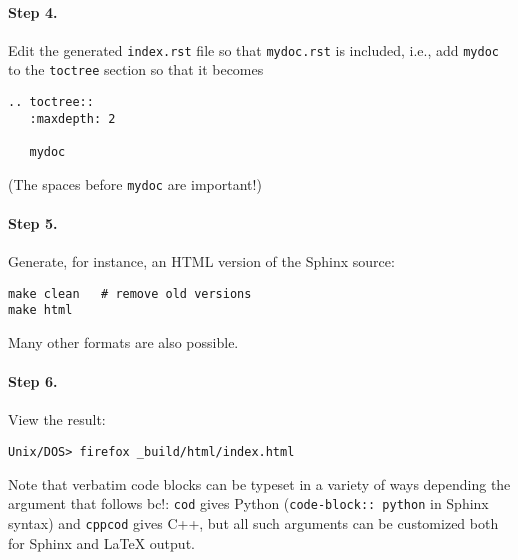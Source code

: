 \documentclass{article}
\begin{document}
\paragraph{Step 4.}
Edit the generated {\fontsize{10pt}{10pt}\verb!index.rst!} file so that {\fontsize{10pt}{10pt}\verb!mydoc.rst!}
is included, i.e., add {\fontsize{10pt}{10pt}\verb!mydoc!} to the {\fontsize{10pt}{10pt}\verb!toctree!} section so that it becomes
\begin{Verbatim}[fontsize=\fontsize{9pt}{9pt},tabsize=8,baselinestretch=0.85,
fontfamily=tt,xleftmargin=7mm]
.. toctree::
   :maxdepth: 2

   mydoc
\end{Verbatim}
\noindent
(The spaces before {\fontsize{10pt}{10pt}\verb!mydoc!} are important!)

\paragraph{Step 5.}
Generate, for instance, an HTML version of the Sphinx source:
\vspace{4pt}
\begin{Verbatim}[numbers=none,frame=lines,label=\fbox{{\tiny Terminal}},fontsize=\fontsize{9pt}{9pt},
labelposition=topline,framesep=2.5mm,framerule=0.7pt]
make clean   # remove old versions
make html
\end{Verbatim}
Many other formats are also possible.

\paragraph{Step 6.}
View the result:
\vspace{4pt}
\begin{Verbatim}[numbers=none,frame=lines,label=\fbox{{\tiny Terminal}},fontsize=\fontsize{9pt}{9pt},
labelposition=topline,framesep=2.5mm,framerule=0.7pt]
Unix/DOS> firefox _build/html/index.html
\end{Verbatim}

Note that verbatim code blocks can be typeset in a variety of ways
depending the argument that follows {\fontsize{10pt}{10pt}\verb!!bc!}: {\fontsize{10pt}{10pt}\verb!cod!} gives Python
({\fontsize{10pt}{10pt}\verb!code-block:: python!} in Sphinx syntax) and {\fontsize{10pt}{10pt}\verb!cppcod!} gives C++, but
all such arguments can be customized both for Sphinx and {\LaTeX} output.

\end{document}

